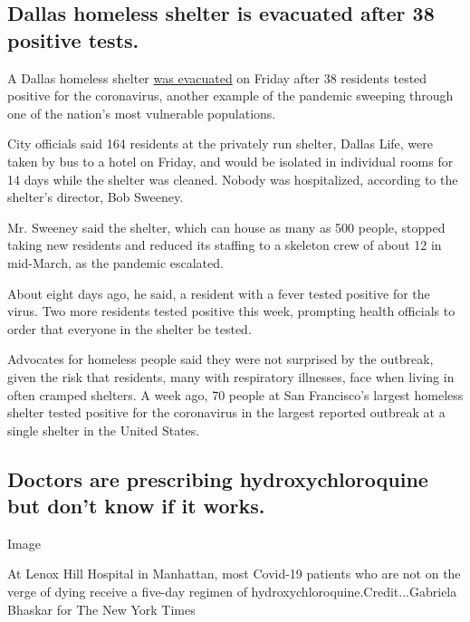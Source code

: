 \hypertarget{dallas-homeless-shelter-is-evacuated-after-38-positive-tests}{%
\subsection{Dallas homeless shelter is evacuated after 38 positive
tests.}\label{dallas-homeless-shelter-is-evacuated-after-38-positive-tests}}

A Dallas homeless shelter
\href{https://www.nytimes3xbfgragh.onion/2020/04/17/us/dallas-homeless-shelter-coronavirus.html}{was
evacuated} on Friday after 38 residents tested positive for the
coronavirus, another example of the pandemic sweeping through one of the
nation's most vulnerable populations.

City officials said 164 residents at the privately run shelter, Dallas
Life, were taken by bus to a hotel on Friday, and would be isolated in
individual rooms for 14 days while the shelter was cleaned. Nobody was
hospitalized, according to the shelter's director, Bob Sweeney.

Mr. Sweeney said the shelter, which can house as many as 500 people,
stopped taking new residents and reduced its staffing to a skeleton crew
of about 12 in mid-March, as the pandemic escalated.

About eight days ago, he said, a resident with a fever tested positive
for the virus. Two more residents tested positive this week, prompting
health officials to order that everyone in the shelter be tested.

Advocates for homeless people said they were not surprised by the
outbreak, given the risk that residents, many with respiratory
illnesses, face when living in often cramped shelters. A week ago, 70
people at San Francisco's largest homeless shelter tested positive for
the coronavirus in the largest reported outbreak at a single shelter in
the United States.

\hypertarget{doctors-are-prescribing-hydroxychloroquine-but-dont-know-if-it-works}{%
\subsection{Doctors are prescribing hydroxychloroquine but don't know if
it
works.}\label{doctors-are-prescribing-hydroxychloroquine-but-dont-know-if-it-works}}

Image

At Lenox Hill Hospital in Manhattan, most Covid-19 patients who are not
on the verge of dying receive a five-day regimen of
hydroxychloroquine.Credit...Gabriela Bhaskar for The New York Times

